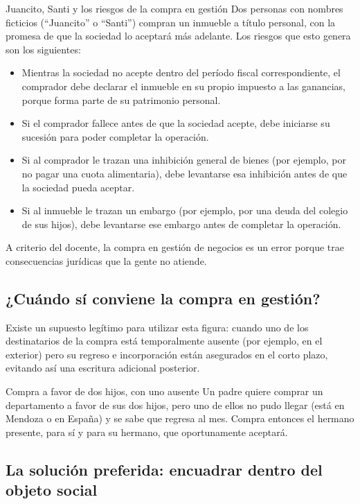 \documentclass[12pt,oneside]{book}
\begin{document}
\begin{example}{Juancito, Santi y los riesgos de la compra en gestión}
Dos personas con nombres ficticios (``Juancito'' o ``Santi'') compran un inmueble a título personal, con la promesa de que la sociedad lo aceptará más adelante. Los riesgos que esto genera son los siguientes:
\begin{itemize}
    \item Mientras la sociedad no acepte dentro del período fiscal correspondiente, el comprador debe declarar el inmueble en su propio impuesto a las ganancias, porque forma parte de su patrimonio personal.
    \item Si el comprador fallece antes de que la sociedad acepte, debe iniciarse su sucesión para poder completar la operación.
    \item Si al comprador le trazan una inhibición general de bienes (por ejemplo, por no pagar una cuota alimentaria), debe levantarse esa inhibición antes de que la sociedad pueda aceptar.
    \item Si al inmueble le trazan un embargo (por ejemplo, por una deuda del colegio de sus hijos), debe levantarse ese embargo antes de completar la operación.
\end{itemize}
A criterio del docente, la compra en gestión de negocios es un error porque trae consecuencias jurídicas que la gente no atiende.
\end{example}

\subsection{¿Cuándo sí conviene la compra en gestión?}

Existe un supuesto legítimo para utilizar esta figura: cuando uno de los destinatarios de la compra está temporalmente ausente (por ejemplo, en el exterior) pero su regreso e incorporación están asegurados en el corto plazo, evitando así una escritura adicional posterior.

\begin{example}{Compra a favor de dos hijos, con uno ausente}
Un padre quiere comprar un departamento a favor de sus dos hijos, pero uno de ellos no pudo llegar (está en Mendoza o en España) y se sabe que regresa al mes. Compra entonces el hermano presente, para sí y para su hermano, que oportunamente aceptará.
\end{example}

\subsection{La solución preferida: encuadrar dentro del objeto social}
\end{document}

